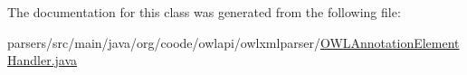 The documentation for this class was generated from the following file\-:\begin{DoxyCompactItemize}
\item 
parsers/src/main/java/org/coode/owlapi/owlxmlparser/\hyperlink{_o_w_l_annotation_element_handler_8java}{O\-W\-L\-Annotation\-Element\-Handler.\-java}\end{DoxyCompactItemize}
